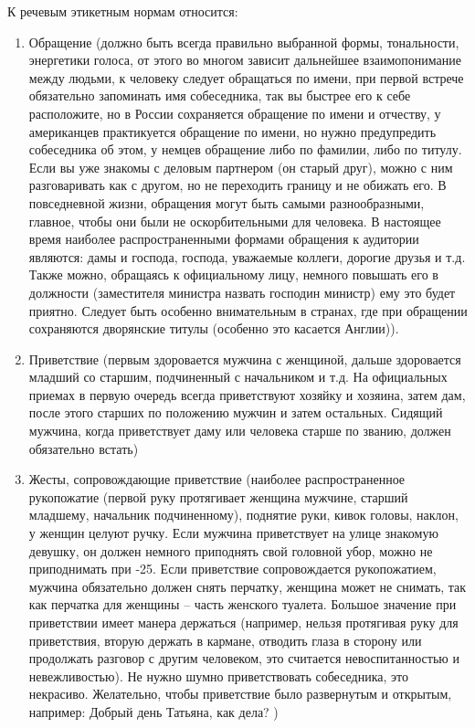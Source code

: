 К речевым этикетным нормам относится:
\begin{enumerate}
\item Обращение (должно быть всегда правильно выбранной формы, тональности, энергетики голоса, от этого во многом зависит дальнейшее взаимопонимание между людьми, к человеку следует обращаться по имени, при первой встрече обязательно запоминать имя собеседника, так вы быстрее его к себе расположите, но в России сохраняется обращение по имени и отчеству, у американцев практикуется обращение по имени, но нужно предупредить собеседника об этом, у немцев обращение либо по фамилии, либо по титулу. Если вы уже знакомы с деловым партнером (он старый друг), можно с ним разговаривать как с другом, но не переходить границу и не обижать его. В повседневной жизни, обращения могут быть самыми разнообразными, главное, чтобы они были не оскорбительными для человека. В настоящее время наиболее распространенными формами обращения к аудитории являются: дамы и господа, господа, уважаемые коллеги, дорогие друзья и т.д. Также можно, обращаясь к официальному лицу, немного повышать его в должности (заместителя министра назвать господин министр) ему это будет приятно. Следует быть особенно внимательным в странах, где при обращении сохраняются дворянские титулы (особенно это касается Англии)).
\item Приветствие (первым здоровается мужчина с женщиной, дальше здоровается младший со старшим, подчиненный с начальником и т.д. На официальных приемах в первую очередь всегда приветствуют хозяйку и хозяина, затем дам, после этого старших по положению мужчин и затем остальных. Сидящий мужчина, когда приветствует даму или человека старше по званию, должен обязательно встать)
\item Жесты, сопровождающие приветствие (наиболее распространенное рукопожатие (первой руку протягивает женщина мужчине, старший младшему, начальник подчиненному), поднятие руки, кивок головы, наклон, у женщин целуют ручку. Если мужчина приветствует на улице знакомую девушку, он должен немного приподнять свой головной убор, можно не приподнимать при -25. Если приветствие сопровождается рукопожатием, мужчина обязательно должен снять перчатку, женщина может не снимать, так как перчатка для женщины – часть женского туалета. Большое значение при приветствии имеет манера держаться (например, нельзя протягивая руку для приветствия, вторую держать в кармане, отводить глаза в сторону или продолжать разговор с другим человеком, это считается невоспитанностью и невежливостью). Не нужно шумно приветствовать собеседника, это некрасиво. Желательно, чтобы приветствие было развернутым и открытым, например: Добрый день Татьяна, как дела? )

\end{enumerate}
